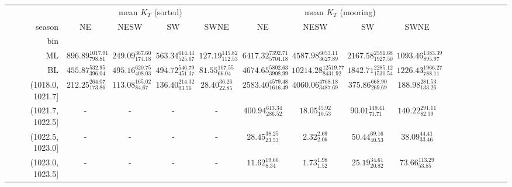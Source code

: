 \begin{tabular}{@{\extracolsep\fill}rcccccccccccccccc}
\toprule
{} & \multicolumn{4}{c}{mean $K_T$ (sorted)} & \multicolumn{4}{c}{mean $K_T$ (mooring)} \\
season &                           NE &                        NESW &                          SW &                        SWNE &                             NE &                             NESW &                             SW &                          SWNE \\
bin              &                              &                             &                             &                             &                                &                                  &                                &                               \\
\midrule
ML               &  $896.89_{798.81}^{1017.91}$ &  $249.09_{174.18}^{367.60}$ &  $563.34_{525.67}^{614.44}$ &  $127.19_{112.53}^{145.82}$ &  $6417.32_{5704.18}^{7392.71}$ &    $4587.98_{3627.89}^{6053.11}$ &  $2167.58_{1927.50}^{2591.68}$ &  $1093.46_{895.97}^{1383.39}$ \\
BL               &   $455.87_{396.04}^{532.95}$ &  $495.16_{408.03}^{620.75}$ &  $494.72_{451.37}^{546.79}$ &    $81.55_{66.04}^{107.55}$ &  $4674.65_{3908.99}^{5802.63}$ &  $10214.28_{8431.92}^{12519.77}$ &  $1842.71_{1530.54}^{2285.12}$ &  $1226.43_{788.11}^{1966.27}$ \\
(1018.0, 1021.7] &   $212.25_{173.86}^{264.07}$ &   $113.08_{84.67}^{165.02}$ &   $136.40_{93.56}^{214.32}$ &     $28.40_{22.85}^{36.26}$ &  $2583.40_{1616.49}^{4579.48}$ &    $4060.06_{3487.69}^{4768.18}$ &     $375.86_{269.69}^{668.90}$ &    $188.98_{133.26}^{281.53}$ \\
(1021.7, 1022.5] &                            - &                           - &                           - &                           - &     $400.94_{286.52}^{613.34}$ &          $18.05_{10.53}^{45.92}$ &       $90.01_{71.71}^{149.41}$ &     $140.22_{82.39}^{291.11}$ \\
(1022.5, 1023.0] &                            - &                           - &                           - &                           - &        $28.45_{23.53}^{38.25}$ &             $2.32_{2.06}^{2.69}$ &        $50.44_{40.53}^{69.16}$ &       $38.09_{33.46}^{44.41}$ \\
(1023.0, 1023.5] &                            - &                           - &                           - &                           - &         $11.62_{8.34}^{19.66}$ &             $1.73_{1.52}^{1.98}$ &        $25.19_{20.82}^{34.61}$ &      $73.66_{53.85}^{113.29}$ \\

\end{tabular}
